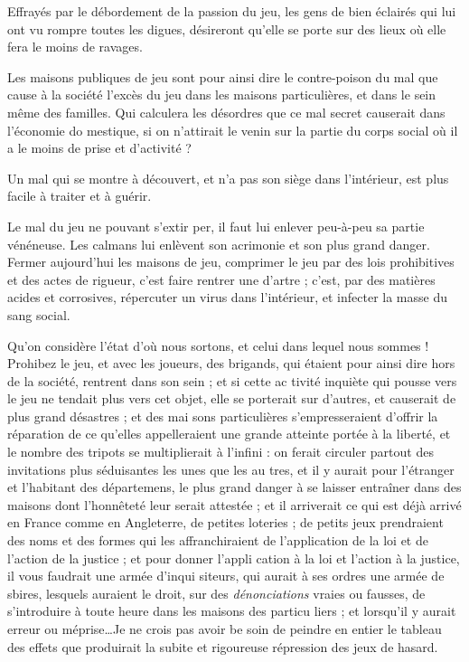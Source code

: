 Effrayés par le débordement de la
passion du jeu, les gens de bien 
éclairés qui lui ont vu rompre toutes
les digues, désireront qu'elle se porte
sur des lieux où elle fera le moins de
ravages.

Les maisons publiques de jeu sont
pour ainsi dire le contre-poison du
mal que cause à la société l'excès du
jeu dans les maisons particulières, et
dans le sein même des familles. Qui
calculera les désordres que ce mal
secret causerait dans l'économie do%
mestique, si on n'attirait le venin sur
la partie du corps social où il a le
moins de prise et d'activité ?

Un mal qui se montre à découvert,
et n'a pas son siège dans l'intérieur,
est plus facile à traiter et à guérir.

Le mal du jeu ne pouvant s'extir%
per, il faut lui enlever peu-à-peu sa
partie vénéneuse. Les calmans lui
enlèvent son acrimonie et son plus
grand danger. Fermer aujourd'hui
les maisons de jeu, comprimer le jeu
par des lois prohibitives et des actes
de rigueur, c'est faire rentrer une
d'artre ; c'est, par des matières acides
et corrosives, répercuter un virus
dans l'intérieur, et infecter la masse
du sang social.

Qu'on considère l'état d'où nous
sortons, et celui dans lequel nous
sommes ! Prohibez le jeu, et avec les
joueurs, des brigands, qui étaient
pour ainsi dire hors de la société,
rentrent dans son sein ; et si cette ac%
tivité inquiète qui pousse vers le jeu
ne tendait plus vers cet objet, elle se
porterait sur d'autres, et causerait
de plus grand désastres ; et des mai%
sons particulières s'empresseraient
d'offrir la réparation de ce qu'elles
appelleraient une grande atteinte
portée à la liberté, et le nombre des
tripots se multiplierait à l'infini : on
ferait circuler partout des invitations
plus séduisantes les unes que les au%
tres, et il y aurait pour l'étranger et
l'habitant des départemens, le plus
grand danger à se laisser entraîner
dans des maisons dont l'honnêteté
leur serait attestée ; et il arriverait ce
qui est déjà arrivé en France comme
en Angleterre, de petites loteries ; de
petits jeux prendraient des noms et
des formes qui les affranchiraient de
l'application de la loi et de l'action
de la justice ; et pour donner l'appli%
cation à la loi et l'action à la justice,
il vous faudrait une armée d'inqui%
siteurs, qui aurait à ses ordres une
armée de sbires, lesquels auraient
le droit, sur des \emph{dénonciations} vraies
ou fausses, de s'introduire à toute
heure dans les maisons des particu%
liers ; et lorsqu'il y aurait erreur ou
méprise\ldots Je ne crois pas avoir be%
soin de peindre en entier le tableau
des effets que produirait la subite
et rigoureuse répression des jeux de
hasard.

